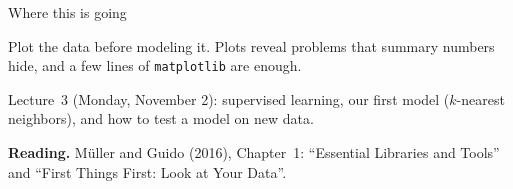 \documentclass[handout,aspectratio=169,t,9pt]{beamer}
\begin{document}
\begin{frame}{Where this is going}
  \vspace{0.3cm}
  \begin{takeaway}
    Plot the data before modeling it.  Plots reveal problems that summary
    numbers hide, and a few lines of \texttt{matplotlib} are enough.
  \end{takeaway}

  \vfill
  \begin{comingup}
    Lecture~3 (Monday, November 2): supervised learning, our first model
    ($k$-nearest neighbors), and how to test a model on new data.
  \end{comingup}

  \vfill
  \textbf{Reading.} M\"{u}ller and Guido (2016), Chapter~1: ``Essential
  Libraries and Tools'' and ``First Things First: Look at Your Data''.
\end{frame}
\end{document}
